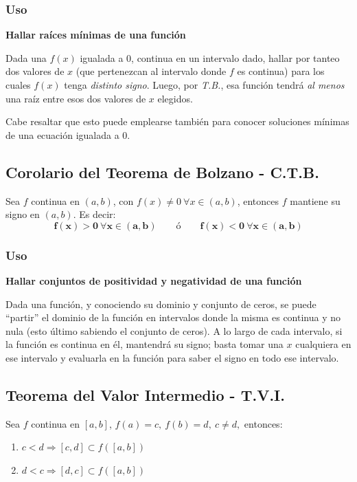 \documentclass[11pt,titlepage]{article}
\newcommand{\littleTitle}[1]{
	\noindent \ignorespaces
	\small \textbf{#1} \normalsize
	\ignorespaces \ignorespacesafterend
}
\newcommand{\comillas}[1]{``#1''}
\begin{document}
\subsubsection{Uso} \label{usobolzano}
\littleTitle{Hallar raíces mínimas de una función}\par
Dada una $f(x)$ igualada a $0$, continua en un intervalo dado, hallar por tanteo dos valores de $x$ (que pertenezcan 
al intervalo donde $f$ es continua) para los cuales $f(x)$ tenga \emph{distinto signo}. Luego, por \emph{T.B.}, esa 
función tendrá \emph{al menos} una raíz entre esos dos valores de $x$ elegidos.\par
Cabe resaltar que esto puede emplearse también para conocer soluciones mínimas de una ecuación igualada a $0$.

\subsection{Corolario del Teorema de Bolzano - C.T.B.}
\begin{commBoxy}
	Sea $f$ continua en $(a,b)$, con $f(x) \neq 0 \ \forall x \in (a,b)$, entonces $f$ mantiene su signo en $(a,b)$. Es decir:
	\begin{equation}
		\boldsymbol{f(x) > 0 \ \forall x \in (a,b) \qquad \text{ó} \qquad f(x) < 0 \ \forall x \in (a,b)} 
	\end{equation}
\end{commBoxy}

\subsubsection{Uso}
\littleTitle{Hallar conjuntos de positividad y negatividad de una función}\par
Dada una función, y conociendo su dominio y conjunto de ceros, se puede \comillas{partir} el dominio de la función en intervalos donde la misma es
continua y no nula (esto último sabiendo el conjunto de ceros). A lo largo de cada intervalo, si la función es continua en él, mantendrá 
su signo; basta tomar una $x$ cualquiera en ese intervalo y evaluarla en la función para saber el signo en todo ese intervalo.

\subsection{Teorema del Valor Intermedio - T.V.I.}
Sea $f$ continua en $[a,b]$, $f(a) = c, \ f(b) = d, \ c \neq d,$ entonces:
\begin{enumerate}[label=\alph*.]
	\item $c < d \Rightarrow [c,d] \subset f\left([a,b]\right)$
	\item $d < c \Rightarrow [d,c] \subset f\left([a,b]\right)$
\end{enumerate}
\end{document}
